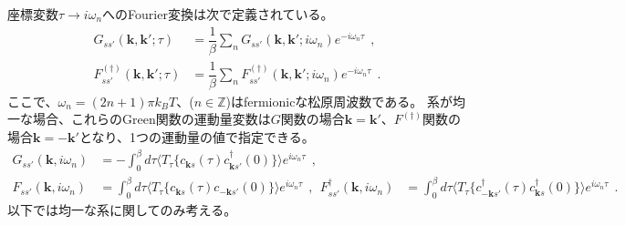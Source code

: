\documentclass[a4j]{jsarticle}
\begin{document}
座標変数$\tau \to i \omega_{n}$へのFourier変換は次で定義されている。
\begin{align}
	G_{ss'}(\bm{k} , \bm{k}' ; \tau)
	 & =
	\dfrac{1}{\beta} \sum_{n}
	G_{ss'}(\bm{k} , \bm{k}' ; i \omega_{n} )
	e^{- i \omega_{n} \tau }
	\ \ , \nonumber \\[2mm]
	F_{ss'}^{(\dagger)}(\bm{k} , \bm{k}' ; \tau)
	 & =
	\dfrac{1}{\beta} \sum_{n}
	F_{ss'}^{(\dagger)}(\bm{k} , \bm{k}' ; i \omega_{n} )
	e^{- i \omega_{n} \tau }
	\ \ .
\end{align}
ここで、$\omega_{n}=(2n+1)\pi k_{B} T$、($n \in \mathbb{Z}$)はfermionicな松原周波数である。
系が均一な場合、これらのGreen関数の運動量変数は$G$関数の場合$\bm{k}=\bm{k}'$、$F^{(\dagger)}$関数の場合$\bm{k}=-\bm{k}'$となり、1つの運動量の値で指定できる。
\begin{align}
	G_{ss'}(\bm{k} , i \omega_{n} )
	 & =
	-
	\int_{0}^{\beta}
	d \tau
	\langle T_{\tau} \{ c_{\bm{k}s}(\tau) c_{\bm{k} s'}^{\dagger}(0) \} \rangle
	e^{i \omega_{n} \tau}
	\ \ ,
	\\[3mm]
	F_{ss'}(\bm{k} , i \omega_{n} )
	 & =
	\int_{0}^{\beta}
	d \tau
	\langle T_{\tau} \{ c_{ \bm{k} s }(\tau) c_{-\bm{k} s' }(0) \} \rangle
	e^{i \omega_{n} \tau}
	\ \ , \ \
	F_{ss'}^{\dagger}(\bm{k} , i \omega_{n} )
	 & =
	\int_{0}^{\beta}
	d \tau
	\langle T_{\tau} \{ c_{ - \bm{k} s' }^{\dagger}(\tau) c_{ \bm{k} s }^{\dagger}(0) \} \rangle
	e^{i \omega_{n} \tau}
	\ \ .
\end{align}
以下では均一な系に関してのみ考える。
\end{document}
